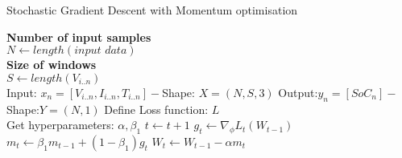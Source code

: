 \begin{algorithm}
  \caption{Stochastic Gradient Descent with Momentum optimisation}
  \begin{algorithmic}[1]
    \STATE \textbf{Number of input samples} \\ $N\gets length(\textit{input data})$\\
    \STATE \textbf{Size of windows} \\ $S\gets length(V_{i..n})$\\
    \STATE Input: $x_n = [V_{i..n}, I_{i..n}, T_{i..n}] - $Shape: $X = (N, S, 3)$
    \STATE Output:$y_n = [SoC_{n}] - $Shape:$Y = (N, 1)$
    \STATE Define Loss function: $L$ \\
           Get hyperparameters: $\alpha, \beta_1$
    \STATE $t \gets t+1$
    \STATE $g_t \gets \nabla_\phi L_t (W_{t-1})$ 
    \STATE $m_t \gets \beta_1 m_{t-1}+(1-\beta_1) g_t $ 
    \STATE $W_t \gets W_{t-1} - \alpha m_t $  
    \ENDWHILE
  \end{algorithmic}
  \label{alg:SGDwM}
\end{algorithm}
